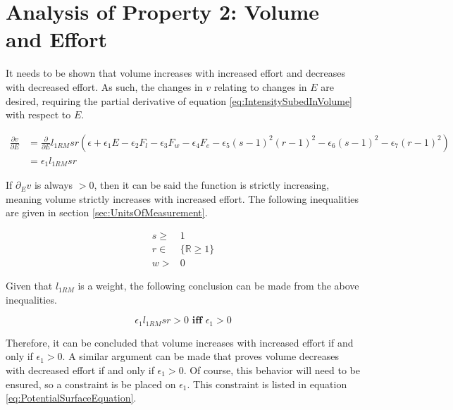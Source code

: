 \section{Analysis of Property 2: Volume and Effort}
\label{sec:PotentialSurfaceAnalysisOfProperty2}

It needs to be shown that volume increases with increased effort and decreases with decreased effort. As such, the changes in $v$ relating to changes in $E$ are desired, requiring the partial derivative of equation \ref{eq:IntensitySubedInVolume} with respect to $E$.

\begin{equation*}
    \begin{split}
    		\frac{\partial v}{\partial E} & =
    		\frac{\partial}{\partial E} l_{1RM}sr\left( 
    			\epsilon+
    			\epsilon_1 E-
    			\epsilon_2 F_l-
    			\epsilon_3 F_w-
    			\epsilon_4 F_e-
    			\epsilon_5(s-1)^2(r-1)^2-
    			\epsilon_6(s-1)^2-
    			\epsilon_7(r-1)^2
    		\right) \\
    		& =\epsilon_1 l_{1RM} sr
    \end{split}
\end{equation*}

If $\partial_{E}v$ is always $>0$, then it can be said the function is strictly increasing, meaning volume strictly increases with increased effort. The following inequalities are given in section \ref{sec:UnitsOfMeasurement}.

\begin{equation*}
    \begin{split}
        s \ge & 1 \\
        r \in & \{ \mathbb{R}\ge 1 \} \\
        w > & 0
    \end{split}
\end{equation*}

Given that $l_{1RM}$ is a weight, the following conclusion can be made from the above inequalities.

\begin{equation*}
    \epsilon_1 l_{1RM} sr> 0 \textbf{ iff } \epsilon_1> 0
\end{equation*}

Therefore, it can be concluded that volume increases with increased effort if and only if $\epsilon_1> 0$. A similar argument can be made that proves volume decreases with decreased effort if and only if $\epsilon_1> 0$. Of course, this behavior will need to be ensured, so a constraint is be placed on $\epsilon_1$. This constraint is listed in equation \ref{eq:PotentialSurfaceEquation}.

